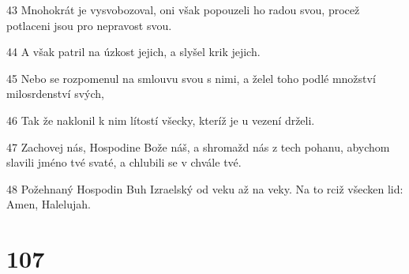 \par 43 Mnohokrát je vysvobozoval, oni však popouzeli ho radou svou, procež potlaceni jsou pro nepravost svou.
\par 44 A však patril na úzkost jejich, a slyšel krik jejich.
\par 45 Nebo se rozpomenul na smlouvu svou s nimi, a želel toho podlé množství milosrdenství svých,
\par 46 Tak že naklonil k nim lítostí všecky, kteríž je u vezení drželi.
\par 47 Zachovej nás, Hospodine Bože náš, a shromažd nás z tech pohanu, abychom slavili jméno tvé svaté, a chlubili se v chvále tvé.
\par 48 Požehnaný Hospodin Buh Izraelský od veku až na veky. Na to rciž všecken lid: Amen, Halelujah.

\chapter{107}

